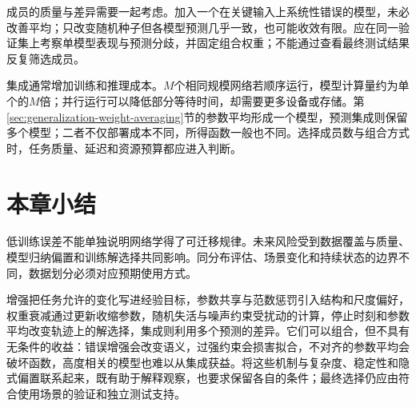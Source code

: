 成员的质量与差异需要一起考虑。加入一个在关键输入上系统性错误的模型，未必改善平均；只改变随机种子但各模型预测几乎一致，也可能收效有限。应在同一验证集上考察单模型表现与预测分歧，并固定组合权重；不能通过查看最终测试结果反复筛选成员。

集成通常增加训练和推理成本。$M$个相同规模网络若顺序运行，模型计算量约为单个的$M$倍；并行运行可以降低部分等待时间，却需要更多设备或存储。第\ref{sec:generalization-weight-averaging}节的参数平均形成一个模型，预测集成则保留多个模型；二者不仅部署成本不同，所得函数一般也不同。选择成员数与组合方式时，任务质量、延迟和资源预算都应进入判断。

\section{本章小结}
\label{sec:generalization-summary}

低训练误差不能单独说明网络学得了可迁移规律。未来风险受到数据覆盖与质量、模型归纳偏置和训练解选择共同影响。同分布评估、场景变化和持续状态的边界不同，数据划分必须对应预期使用方式。

增强把任务允许的变化写进经验目标，参数共享与范数惩罚引入结构和尺度偏好，权重衰减通过更新收缩参数，随机失活与噪声约束受扰动的计算，停止时刻和参数平均改变轨迹上的解选择，集成则利用多个预测的差异。它们可以组合，但不具有无条件的收益：错误增强会改变语义，过强约束会损害拟合，不对齐的参数平均会破坏函数，高度相关的模型也难以从集成获益。将这些机制与复杂度、稳定性和隐式偏置联系起来，既有助于解释观察，也要求保留各自的条件；最终选择仍应由符合使用场景的验证和独立测试支持。
